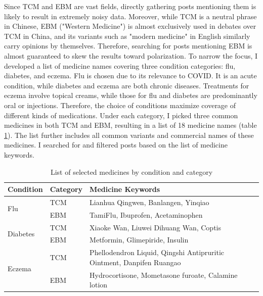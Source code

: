 \documentclass[11pt]{article}
\begin{document}
Since TCM and EBM are vast fields, directly gathering posts mentioning them is likely to result in extremely noisy data. Moreover, while TCM is a neutral phrase in Chinese, EBM ("Western Medicine") is almost exclusively used in debates over TCM in China, and its variants such as "modern medicine" in English similarly carry opinions by themselves. Therefore, searching for posts mentioning EBM is almost guaranteed to skew the results toward polarization. To narrow the focus, I developed a list of medicine names covering three condition categories: flu, diabetes, and eczema. Flu is chosen due to its relevance to COVID. It is an acute condition, while diabetes and eczema are both chronic diseases. Treatments for eczema involve topical creams, while those for flu and diabetes are predominantly oral or injections. Therefore, the choice of conditions maximize coverage of different kinds of medications. Under each category, I picked three common medicines in both TCM and EBM, resulting in a list of 18 medicine names (table \ref{tab:medicine_list}). The list further includes all common variants and commercial names of these medicines. I searched for and filtered posts based on the list of medicine keywords.
\begin{table}[htbp]
    \centering
    \renewcommand{\arraystretch}{1.5}
    \begin{tabular}{|l|l|l|}
        \hline
        \textbf{Condition} & \textbf{Category} & \textbf{Medicine Keywords} \\
        \hline
        \multirow{2}{*}{Flu} & TCM & Lianhua Qingwen, Banlangen, Yinqiao \\ \cline{2-3}
        & EBM & TamiFlu, Ibuprofen, Acetaminophen \\
        \hline
        \multirow{2}{*}{Diabetes} & TCM & Xiaoke Wan, Liuwei Dihuang Wan, Coptis \\ \cline{2-3}
        & EBM & Metformin, Glimepiride, Insulin \\
        \hline
        \multirow{2}{*}{Eczema} & TCM & Phellodendron Liquid, Qingshi Antipruritic Ointment, Danpifen Ruangao \\ \cline{2-3}
        & EBM & Hydrocortisone, Mometasone furoate, Calamine lotion \\
        \hline
    \end{tabular}
    \caption{List of selected medicines by condition and category}
    \label{tab:medicine_list}
\end{table}
\end{document}
